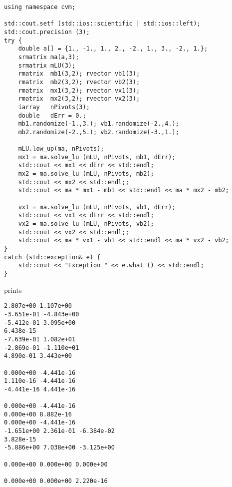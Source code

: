 \begin{Verbatim}
using namespace cvm;

std::cout.setf (std::ios::scientific | std::ios::left); 
std::cout.precision (3);
try {
    double a[] = {1., -1., 1., 2., -2., 1., 3., -2., 1.};
    srmatrix ma(a,3);
    srmatrix mLU(3);
    rmatrix  mb1(3,2); rvector vb1(3);
    rmatrix  mb2(3,2); rvector vb2(3);
    rmatrix  mx1(3,2); rvector vx1(3);
    rmatrix  mx2(3,2); rvector vx2(3);
    iarray   nPivots(3);
    double   dErr = 0.;
    mb1.randomize(-1.,3.); vb1.randomize(-2.,4.);
    mb2.randomize(-2.,5.); vb2.randomize(-3.,1.);

    mLU.low_up(ma, nPivots);
    mx1 = ma.solve_lu (mLU, nPivots, mb1, dErr);
    std::cout << mx1 << dErr << std::endl;
    mx2 = ma.solve_lu (mLU, nPivots, mb2);
    std::cout << mx2 << std::endl;;
    std::cout << ma * mx1 - mb1 << std::endl << ma * mx2 - mb2;

    vx1 = ma.solve_lu (mLU, nPivots, vb1, dErr);
    std::cout << vx1 << dErr << std::endl;
    vx2 = ma.solve_lu (mLU, nPivots, vb2);
    std::cout << vx2 << std::endl;;
    std::cout << ma * vx1 - vb1 << std::endl << ma * vx2 - vb2;
}
catch (std::exception& e) {
    std::cout << "Exception " << e.what () << std::endl;
}
\end{Verbatim}
prints
\begin{Verbatim}
2.807e+00 1.107e+00
-3.651e-01 -4.843e+00
-5.412e-01 3.095e+00
6.438e-15
-7.639e-01 1.082e+01
-2.869e-01 -1.110e+01
4.890e-01 3.443e+00

0.000e+00 -4.441e-16
1.110e-16 -4.441e-16
-4.441e-16 4.441e-16

0.000e+00 -4.441e-16
0.000e+00 8.882e-16
0.000e+00 -4.441e-16
-1.651e+00 2.361e-01 -6.384e-02
3.828e-15
-5.886e+00 7.038e+00 -3.125e+00

0.000e+00 0.000e+00 0.000e+00

0.000e+00 0.000e+00 2.220e-16
\end{Verbatim}
\newpage



